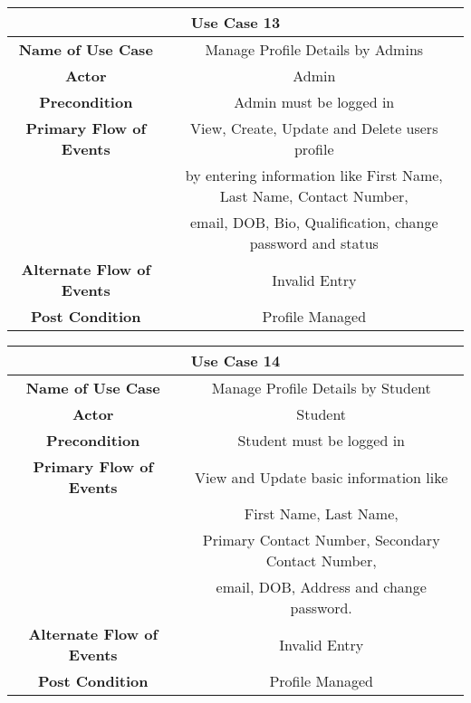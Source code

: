 \vspace{1cm}
\begin{center}
    \begin{tabular}{|c|c|}
        \hline
        \multicolumn{2}{|c|}{Use Case 13} \\
        \hline
        \textbf{Name of Use Case} & Manage Profile Details by Admins \\
        \hline
        \textbf{Actor} & Admin \\
        \hline
        \textbf{Precondition} & Admin must be logged in \\
        \hline
        \textbf{Primary Flow of Events} & View, Create, Update and Delete users profile \\
        & by entering information like First Name, Last Name, Contact Number, \\
        & email, DOB, Bio, Qualification, change password and status \\
        \hline
        \textbf{Alternate Flow of Events} & Invalid Entry \\
        \hline
        \textbf{Post Condition} & Profile Managed \\
        \hline
    \end{tabular}
\end{center}

\vspace{1cm}
\begin{center}
    \begin{tabular}{|c|c|}
        \hline
        \multicolumn{2}{|c|}{Use Case 14} \\
        \hline
        \textbf{Name of Use Case} & Manage Profile Details by Student \\
        \hline
        \textbf{Actor} & Student \\
        \hline
        \textbf{Precondition} & Student must be logged in \\
        \hline
        \textbf{Primary Flow of Events} & View and Update basic information like \\
        & First Name, Last Name, \\
        & Primary Contact Number, Secondary Contact Number, \\
        & email, DOB, Address and change password. \\
        \hline
        \textbf{Alternate Flow of Events} & Invalid Entry \\
        \hline
        \textbf{Post Condition} & Profile Managed \\
        \hline
    \end{tabular}
\end{center}

